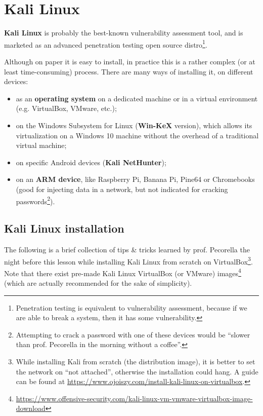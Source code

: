 \section{Kali Linux}
\textbf{Kali Linux} is probably the best-known vulnerability assessment tool, and is marketed as an advanced penetration testing open source distro\footnote{Penetration testing is equivalent to vulnerability assessment, because if we are able to break a system, then it has some vulnerability.}.

Although on paper it is easy to install, in practice this is a rather complex (or at least time-consuming) process. There are many ways of installing it, on different devices:

\begin{itemize}
	\item as an \textbf{operating system} on a dedicated machine or in a virtual environment (e.g. VirtualBox, VMware, etc.);
	\item on the Windows Subsystem for Linux (\textbf{Win-KeX} version), which allows its virtualization on a Windows 10 machine without the overhead of a traditional virtual machine;
	\item on specific Android devices (\textbf{Kali NetHunter});
	\item on an \textbf{ARM device}, like Raspberry Pi, Banana Pi, Pine64 or Chromebooks (good for injecting data in a network, but not indicated for cracking passwords\footnote{Attempting to crack a password with one of these devices would be “slower than prof. Pecorella in the morning without a coffee”.}).
\end{itemize}
 

\subsection{Kali Linux installation}
The following is a brief collection of tips \& tricks learned by prof. Pecorella the night before this lesson while installing Kali Linux from scratch on VirtualBox\footnote{While installing Kali from scratch (the distribution image), it is better to set the network on “not attached”, otherwise the installation could hang. A guide can be found at \url{https://www.ojoiszy.com/install-kali-linux-on-virtualbox}.}. Note that there exist pre-made Kali Linux VirtualBox (or VMware) images\footnote{\url{ https://www.offensive-security.com/kali-linux-vm-vmware-virtualbox-image-download}} (which are actually recommended for the sake of simplicity).

